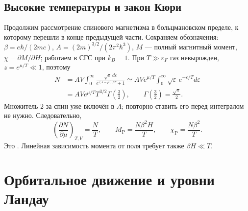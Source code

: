 \documentclass[../final.tex]{subfiles}
\begin{document}
\ifSubfilesClassLoaded{\setcounter{chapter}{1}\setcounter{section}{9}}{}

\subsection{Высокие температуры и закон Кюри}
Продолжим рассмотрение спинового магнетизма в больцмановском пределе,
к которому перешли в конце предыдущей части. Сохраняем обозначения:
$\beta=e\hbar/(2mc)$, $A=(2m)^{3/2}/(2\pi^2\hbar^3)$,
$M$ --- полный магнитный момент, $\chi=\partial M/\partial H$;
работаем в СГС при $k_B=1$.
При $T\gg\varepsilon_F$ газ невырожден, $z=e^{\mu/T}\ll1$, поэтому
\begin{align*}
 N&=AV\int_0^\infty\frac{\sqrt\varepsilon\,d\varepsilon}
 {e^{(\varepsilon-\mu)/T}+1}
 \simeq AVe^{\mu/T}\int_0^\infty\sqrt\varepsilon\,e^{-\varepsilon/T}d\varepsilon\\
 &=AVe^{\mu/T}T^{3/2}\Gamma\left(\frac32\right),
 \qquad \Gamma\left(\frac32\right)=\frac{\sqrt\pi}{2}.
\end{align*}
Множитель 2 за спин уже включён в $A$; повторно ставить его перед интегралом
не нужно. Следовательно,
\begin{equation*}
 \left(\frac{\partial N}{\partial\mu}\right)_{T,V}=\frac NT,
 \qquad M_{\mathrm P}=\frac{N\beta^2H}{T},
 \qquad \chi_{\mathrm P}=\frac{N\beta^2}{T}.
\end{equation*}
Это . Линейная зависимость момента от поля требует
также $\beta H\ll T$.

\section{Орбитальное движение и уровни Ландау}
\end{document}
